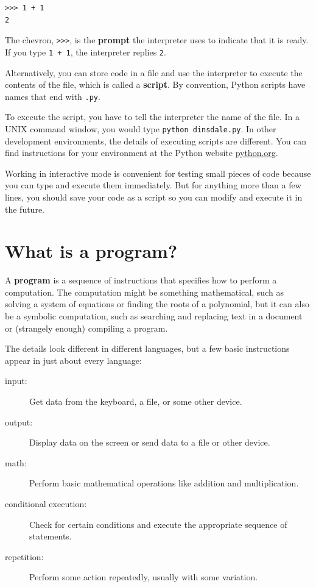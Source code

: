 \documentclass[10pt]{book}
\begin{document}

\beforeverb
\begin{verbatim}
>>> 1 + 1
2
\end{verbatim}
\afterverb
%
The chevron, {\tt >>>}, is the
{\bf prompt} the interpreter uses to indicate that it is ready.  If
you type {\tt 1 + 1}, the interpreter replies {\tt 2}.


Alternatively, you can store code in a file and use the interpreter to
execute the contents of the file, which is called a {\bf script}.  By
convention, Python scripts have names that end with {\tt .py}.


To execute the script, you have to tell the interpreter the name of
the file.  In a UNIX command window, you would type {\tt python
dinsdale.py}.  In other development environments, the details of
executing scripts are different.  You can find instructions for
your environment at the Python website \url{python.org}.


Working in interactive mode is convenient for testing small pieces of
code because you can type and execute them immediately.  But for
anything more than a few lines, you should save your code
as a script so you can modify and execute it in the future.


\section{What is a program?}

A {\bf program} is a sequence of instructions that specifies how to
perform a computation.  The computation might be something
mathematical, such as solving a system of equations or finding the
roots of a polynomial, but it can also be a symbolic computation, such
as searching and replacing text in a document or (strangely enough)
compiling a program.


The details look different in different languages, but a few basic
instructions appear in just about every language:

\begin{description}

\item[input:] Get data from the keyboard, a file, or some
other device.

\item[output:] Display data on the screen or send data to a
file or other device.

\item[math:] Perform basic mathematical operations like addition and
multiplication.

\item[conditional execution:] Check for certain conditions and
execute the appropriate sequence of statements.

\item[repetition:] Perform some action repeatedly, usually with
some variation.

\end{description}
\end{document}
